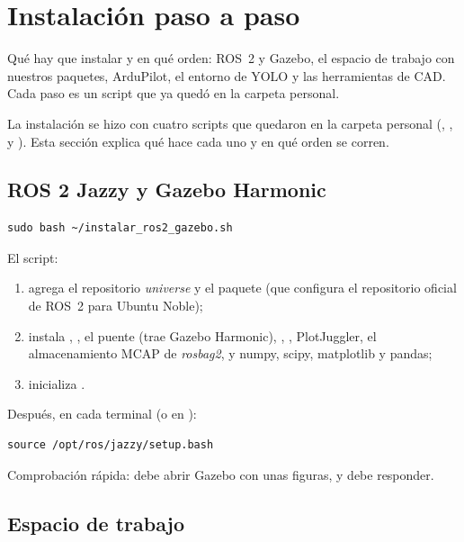 \chapter{Instalación paso a paso}
\label{cap:instalacion}

\begin{enpocas}
Qué hay que instalar y en qué orden: ROS~2 y Gazebo, el espacio de trabajo con nuestros paquetes, ArduPilot, el entorno de YOLO y las herramientas de CAD. Cada paso es un script que ya quedó en la carpeta personal.
\end{enpocas}

La instalación se hizo con cuatro scripts que quedaron en la carpeta personal
(, , 
y ). Esta sección explica qué hace cada uno y en qué orden se corren.

\section{ROS 2 Jazzy y Gazebo Harmonic}

\begin{lstlisting}[style=bash]
sudo bash ~/instalar_ros2_gazebo.sh
\end{lstlisting}

El script:
\begin{enumerate}
  \item agrega el repositorio \emph{universe} y el paquete  (que configura
        el repositorio oficial de ROS~2 para Ubuntu Noble);
  \item instala , , el puente 
        (trae Gazebo Harmonic), , ,
        PlotJuggler, el almacenamiento MCAP de \emph{rosbag2},  y numpy, scipy,
        matplotlib y pandas;
  \item inicializa .
\end{enumerate}

Después, en cada terminal (o en ):
\begin{lstlisting}[style=bash]
source /opt/ros/jazzy/setup.bash
\end{lstlisting}

Comprobación rápida:  debe abrir Gazebo con unas figuras, y
 debe responder.

\section{Espacio de trabajo}

